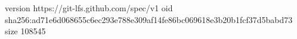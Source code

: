 version https://git-lfs.github.com/spec/v1
oid sha256:ad71e6d068655c6ec293e788e309af14fe86bc069618e3b20b1fcf37d5babd73
size 108545
